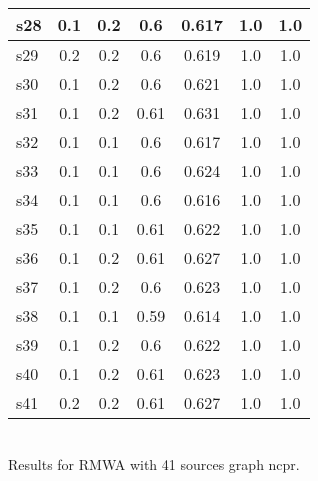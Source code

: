 \documentclass{article}
\begin{document}
\begin{tabular}{|l|c|c|c|c|c|c|}
\hline
s28 &0.1 & 0.2 & 0.6 & 0.617 & 1.0 & 1.0\\
\hline
s29 &0.2 & 0.2 & 0.6 & 0.619 & 1.0 & 1.0\\
\hline
s30 &0.1 & 0.2 & 0.6 & 0.621 & 1.0 & 1.0\\
\hline
s31 &0.1 & 0.2 & 0.61 & 0.631 & 1.0 & 1.0\\
\hline
s32 &0.1 & 0.1 & 0.6 & 0.617 & 1.0 & 1.0\\
\hline
s33 &0.1 & 0.1 & 0.6 & 0.624 & 1.0 & 1.0\\
\hline
s34 &0.1 & 0.1 & 0.6 & 0.616 & 1.0 & 1.0\\
\hline
s35 &0.1 & 0.1 & 0.61 & 0.622 & 1.0 & 1.0\\
\hline
s36 &0.1 & 0.2 & 0.61 & 0.627 & 1.0 & 1.0\\
\hline
s37 &0.1 & 0.2 & 0.6 & 0.623 & 1.0 & 1.0\\
\hline
s38 &0.1 & 0.1 & 0.59 & 0.614 & 1.0 & 1.0\\
\hline
s39 &0.1 & 0.2 & 0.6 & 0.622 & 1.0 & 1.0\\
\hline
s40 &0.1 & 0.2 & 0.61 & 0.623 & 1.0 & 1.0\\
\hline
s41 &0.2 & 0.2 & 0.61 & 0.627 & 1.0 & 1.0\\
\hline
\end{tabular}\\

\noindent Results for RMWA with 41 sources graph ncpr.
\end{document}
